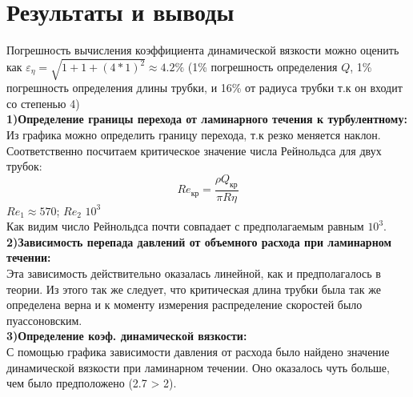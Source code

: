 \section*{Результаты и выводы}
Погрешность вычисления коэффициента динамической вязкости можно оценить как
$\varepsilon_{\eta} = \sqrt{1 + 1 + (4*1)^2} \approx 4.2 \%$
(1\% погрешность определения $Q$, 1\% погрешность определения длины трубки, и 16\% 
от радиуса трубки т.к он входит со степенью 4)\\
\indent \textbf{1)Определение границы перехода от ламинарного течения к турбулентному:}\\ 
Из графика можно определить границу перехода, т.к резко меняется наклон. Соответственно
посчитаем критическое значение числа Рейнольдса для двух трубок:\\ 
$$Re_{\text{кр}} = \frac{\rho Q_{\text{кр}}}{\pi R \eta}$$
$Re_1 \approx 570$;   $Re_2$  \approx $10^3$\\ 
Как видим число Рейнольдса почти совпадает с предполагаемым равным $10^3$.\\ 
\textbf{2)Зависимость перепада давлений от объемного расхода при ламинарном течении:}\\ 
Эта зависимость действительно оказалась линейной, как и предполагалось в теории. Из
этого так же следует, что критическая длина трубки была так же определена верна и к
моменту измерения распределение скоростей было пуассоновским. \\
\textbf{3)Определение коэф. динамической вязкости:}\\ 
С помощью графика зависимости давления от расхода было найдено значение динамической вязкости
при ламинарном течении. Оно оказалось чуть больше, чем было предположено
(2.7 > 2). 
